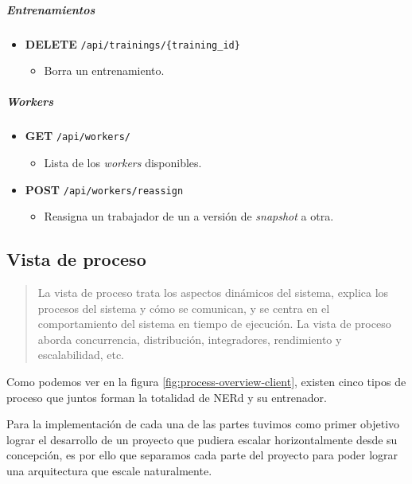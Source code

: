 \documentclass[12pt,a4paper,]{scrartcl}
\providecommand{\tightlist}{%
  \setlength{\itemsep}{0pt}\setlength{\parskip}{0pt}}
\let\oldsubparagraph\subparagraph
\renewcommand{\subparagraph}[1]{\oldsubparagraph{#1}\mbox{}}
\begin{document}
\hypertarget{entrenamientos}{%
\subparagraph{Entrenamientos}\label{entrenamientos}}

\begin{itemize}
\tightlist
\item
  \textbf{DELETE} \texttt{/api/trainings/\{training\_id\}}

  \begin{itemize}
  \tightlist
  \item
    Borra un entrenamiento.
  \end{itemize}
\end{itemize}

\hypertarget{workers}{%
\subparagraph{Workers}\label{workers}}

\begin{itemize}
\tightlist
\item
  \textbf{GET} \texttt{/api/workers/}

  \begin{itemize}
  \tightlist
  \item
    Lista de los \emph{workers} disponibles.
  \end{itemize}
\item
  \textbf{POST} \texttt{/api/workers/reassign}

  \begin{itemize}
  \tightlist
  \item
    Reasigna un trabajador de un a versión de \emph{snapshot} a otra.
  \end{itemize}
\end{itemize}

\hypertarget{vista-de-proceso}{%
\subsection{Vista de proceso}\label{vista-de-proceso}}

\begin{quote}
La vista de proceso trata los aspectos dinámicos del sistema, explica los procesos del sistema y cómo se comunican, y se centra en el comportamiento del sistema en tiempo de ejecución.
La vista de proceso aborda concurrencia, distribución, integradores, rendimiento y escalabilidad, etc.
\end{quote}

Como podemos ver en la figura \ref{fig:process-overview-client}, existen cinco tipos de proceso que juntos forman la totalidad de NERd y su entrenador.

Para la implementación de cada una de las partes tuvimos como primer objetivo lograr el desarrollo de un proyecto que pudiera escalar horizontalmente desde su concepción, es por ello que separamos cada parte del proyecto para poder lograr una arquitectura que escale naturalmente.
\end{document}
